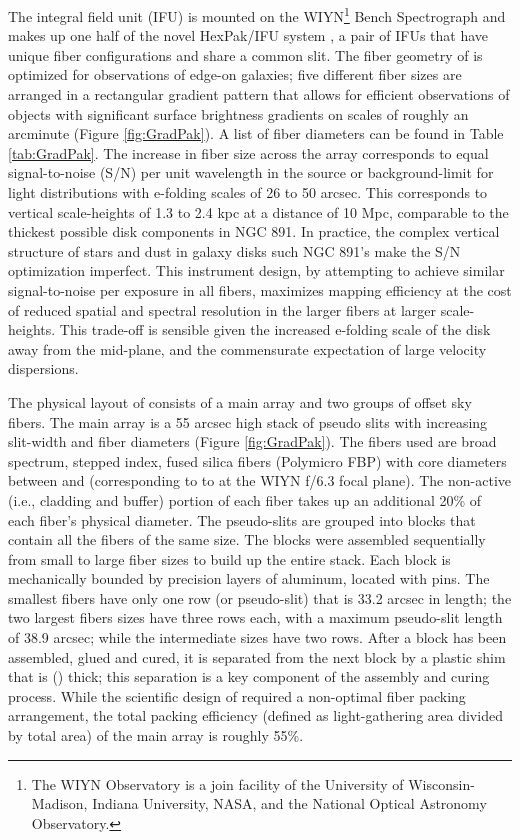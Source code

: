 The \GP integral field unit (IFU) is mounted on the WIYN\footnote{The
  WIYN Observatory is a join facility of the University of
  Wisconsin-Madison, Indiana University, NASA, and the National
  Optical Astronomy Observatory.}  Bench Spectrograph
\citep{Barden94,Bershady08,Knezek10} and makes up one half of the
novel HexPak/\GP IFU system \citep{Wood12}, a pair of IFUs that have
unique fiber configurations and share a common slit. The fiber
geometry of \GP is optimized for observations of edge-on galaxies;
five different fiber sizes are arranged in a rectangular gradient
pattern that allows for efficient observations of objects with
significant surface brightness gradients on scales of roughly an
arcminute (Figure \ref{fig:GradPak}).  A list of fiber diameters can
be found in Table \ref{tab:GradPak}. The increase in fiber size across
the array corresponds to equal signal-to-noise (S/N) per unit
wavelength in the source or background-limit for light distributions
with e-folding scales of 26 to 50 arcsec. This corresponds to vertical
scale-heights of 1.3 to 2.4 kpc at a distance of 10 Mpc, comparable to
the thickest possible disk components in NGC 891.  In practice, the
complex vertical structure of stars and dust in galaxy disks such NGC
891's make the S/N optimization imperfect. This instrument design, by
attempting to achieve similar signal-to-noise per exposure in all
fibers, maximizes mapping efficiency at the cost of reduced spatial
and spectral resolution in the larger fibers at larger
scale-heights. This trade-off is sensible given the increased
e-folding scale of the disk away from the mid-plane, and the
commensurate expectation of large velocity dispersions.

The physical layout of \GP consists of a main array and two groups of
offset sky fibers. The main array is a 55 arcsec high stack of pseudo
slits with increasing slit-width and fiber diameters (Figure
\ref{fig:GradPak}). The fibers used are broad spectrum, stepped index,
fused silica fibers (Polymicro FBP) with core diameters between
 and  (corresponding to 
to  at the WIYN f/6.3 focal plane). The non-active
(i.e., cladding and buffer) portion of each fiber takes up an
additional 20\% of each fiber's physical diameter. The pseudo-slits
are grouped into blocks that contain all the fibers of the same
size. The blocks were assembled sequentially from small to large fiber
sizes to build up the entire stack. Each block is mechanically bounded
by precision layers of aluminum, located with pins. The smallest
fibers have only one row (or pseudo-slit) that is 33.2 arcsec in
length; the two largest fibers sizes have three rows each, with a
maximum pseudo-slit length of 38.9 arcsec; while the intermediate
sizes have two rows. After a block has been assembled, glued and
cured, it is separated from the next block by a plastic shim that is
 () thick; this separation is a key
component of the assembly and curing process.  While the scientific
design of \GP required a non-optimal fiber packing arrangement, the
total packing efficiency (defined as light-gathering area divided by
total area) of the main array is roughly 55\%.

